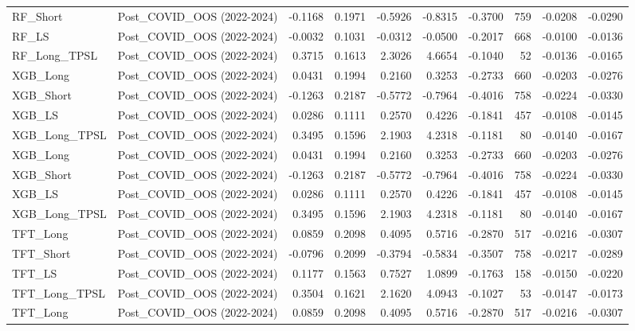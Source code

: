 \begin{tabular}{llrrrrrrrr}
\cline{1-10}
RF\_Short & Post\_COVID\_OOS (2022-2024) & -0.1168 & 0.1971 & -0.5926 & -0.8315 & -0.3700 & 759 & -0.0208 & -0.0290 \\
\cline{1-10}
RF\_LS & Post\_COVID\_OOS (2022-2024) & -0.0032 & 0.1031 & -0.0312 & -0.0500 & -0.2017 & 668 & -0.0100 & -0.0136 \\
\cline{1-10}
RF\_Long\_TPSL & Post\_COVID\_OOS (2022-2024) & 0.3715 & 0.1613 & 2.3026 & 4.6654 & -0.1040 & 52 & -0.0136 & -0.0165 \\
\cline{1-10}
XGB\_Long & Post\_COVID\_OOS (2022-2024) & 0.0431 & 0.1994 & 0.2160 & 0.3253 & -0.2733 & 660 & -0.0203 & -0.0276 \\
\cline{1-10}
XGB\_Short & Post\_COVID\_OOS (2022-2024) & -0.1263 & 0.2187 & -0.5772 & -0.7964 & -0.4016 & 758 & -0.0224 & -0.0330 \\
\cline{1-10}
XGB\_LS & Post\_COVID\_OOS (2022-2024) & 0.0286 & 0.1111 & 0.2570 & 0.4226 & -0.1841 & 457 & -0.0108 & -0.0145 \\
\cline{1-10}
XGB\_Long\_TPSL & Post\_COVID\_OOS (2022-2024) & 0.3495 & 0.1596 & 2.1903 & 4.2318 & -0.1181 & 80 & -0.0140 & -0.0167 \\
\cline{1-10}
XGB\_Long & Post\_COVID\_OOS (2022-2024) & 0.0431 & 0.1994 & 0.2160 & 0.3253 & -0.2733 & 660 & -0.0203 & -0.0276 \\
\cline{1-10}
XGB\_Short & Post\_COVID\_OOS (2022-2024) & -0.1263 & 0.2187 & -0.5772 & -0.7964 & -0.4016 & 758 & -0.0224 & -0.0330 \\
\cline{1-10}
XGB\_LS & Post\_COVID\_OOS (2022-2024) & 0.0286 & 0.1111 & 0.2570 & 0.4226 & -0.1841 & 457 & -0.0108 & -0.0145 \\
\cline{1-10}
XGB\_Long\_TPSL & Post\_COVID\_OOS (2022-2024) & 0.3495 & 0.1596 & 2.1903 & 4.2318 & -0.1181 & 80 & -0.0140 & -0.0167 \\
\cline{1-10}
TFT\_Long & Post\_COVID\_OOS (2022-2024) & 0.0859 & 0.2098 & 0.4095 & 0.5716 & -0.2870 & 517 & -0.0216 & -0.0307 \\
\cline{1-10}
TFT\_Short & Post\_COVID\_OOS (2022-2024) & -0.0796 & 0.2099 & -0.3794 & -0.5834 & -0.3507 & 758 & -0.0217 & -0.0289 \\
\cline{1-10}
TFT\_LS & Post\_COVID\_OOS (2022-2024) & 0.1177 & 0.1563 & 0.7527 & 1.0899 & -0.1763 & 158 & -0.0150 & -0.0220 \\
\cline{1-10}
TFT\_Long\_TPSL & Post\_COVID\_OOS (2022-2024) & 0.3504 & 0.1621 & 2.1620 & 4.0943 & -0.1027 & 53 & -0.0147 & -0.0173 \\
\cline{1-10}
TFT\_Long & Post\_COVID\_OOS (2022-2024) & 0.0859 & 0.2098 & 0.4095 & 0.5716 & -0.2870 & 517 & -0.0216 & -0.0307 \\

\end{tabular}
